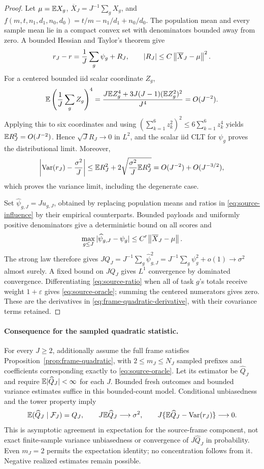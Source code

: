 \begin{proof}
Let $\mu=\mathbb{E} X_g$, $\overline X_J=J^{-1}\sum_gX_g$, and $f(m,t,n_1,d_1,n_0,d_0)=t/m-n_1/d_1+n_0/d_0$. The population mean and every sample mean lie in a compact convex set with denominators bounded away from zero. A bounded Hessian and Taylor's theorem give
\begin{equation}
 r_J-r=\frac1J\sum_g\psi_g+R_J,\qquad
 |R_J|\le C\left\lVert\overline X_J-\mu\right\rVert^2.
 \label{eq:source-expansion}
\end{equation}
For a centered bounded iid scalar coordinate $Z_g$,
\[
 \mathbb{E}\left(\frac1J\sum_g Z_g\right)^4
 =\frac{J\mathbb{E} Z_g^4+3J(J-1)(\mathbb{E} Z_g^2)^2}{J^4}=O(J^{-2}).
\]
Applying this to six coordinates and using $(\sum_{k=1}^6z_k^2)^2\le6\sum_{k=1}^6z_k^4$ yields $\mathbb{E} R_J^2=O(J^{-2})$. Hence $\sqrt J R_J\to0$ in $L^2$, and the scalar iid CLT for $\psi_g$ proves the distributional limit. Moreover,
\[
 \left|\operatorname{Var}(r_J)-\frac{\sigma^2}{J}\right|
 \le \mathbb{E} R_J^2+2\sqrt{\frac{\sigma^2}{J}\mathbb{E} R_J^2}
 =O(J^{-2})+O(J^{-3/2}),
\]
which proves the variance limit, including the degenerate case.

Set $\widehat\psi_{g,J}=Ju_{g,J}$, obtained by replacing population means and ratios in \eqref{eq:source-influence} by their empirical counterparts. Bounded payloads and uniformly positive denominators give a deterministic bound on all scores and
\[
 \max_{g\le J}|\widehat\psi_{g,J}-\psi_g|
 \le C'\left\lVert\overline X_J-\mu\right\rVert.
\]
The strong law therefore gives $JQ_J=J^{-1}\sum_g\widehat\psi_{g,J}^2=J^{-1}\sum_g\psi_g^2+o(1)\to\sigma^2$ almost surely. A fixed bound on $JQ_J$ gives $L^1$ convergence by dominated convergence. Differentiating \eqref{eq:source-ratio} when all of task $g$'s totals receive weight $1+\varepsilon$ gives \eqref{eq:source-oracle}; summing the centered numerators gives zero. These are the derivatives in \eqref{eq:frame-quadratic-derivative}, with their covariance terms retained.
\end{proof}

\paragraph{Consequence for the sampled quadratic statistic.}
For every $J\ge2$, additionally assume the full frame satisfies Proposition~\ref{prop:frame-quadratic}, with $2\le m_J\le N_J$ sampled prefixes and coefficients corresponding exactly to \eqref{eq:source-oracle}. Let its estimator be $\widehat Q_J$ and require $\mathbb{E}|\widehat Q_J|<\infty$ for each $J$. Bounded fresh outcomes and bounded variance estimates suffice in this bounded-count model. Conditional unbiasedness and the tower property imply
\begin{equation}
 \mathbb{E}(\widehat Q_J\mid\mathcal F_J)=Q_J,\qquad
 J\mathbb{E}\widehat Q_J\longrightarrow\sigma^2,\qquad
 J\{\mathbb{E}\widehat Q_J-\operatorname{Var}(r_J)\}\longrightarrow0.
 \label{eq:source-expectation}
\end{equation}
This is asymptotic agreement in expectation for the source-frame component, not exact finite-sample variance unbiasedness or convergence of $J\widehat Q_J$ in probability. Even $m_J=2$ permits the expectation identity; no concentration follows from it. Negative realized estimates remain possible.

